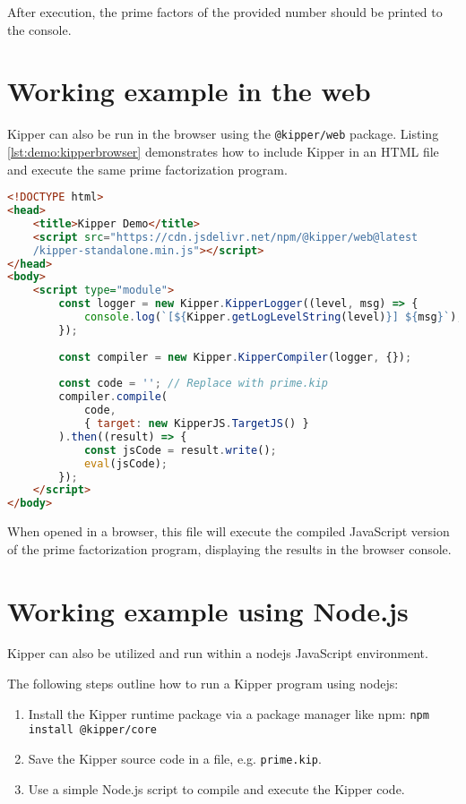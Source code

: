 After execution, the prime factors of the provided number should be printed to the console.

\section{Working example in the web}

Kipper can also be run in the browser using the \texttt{@kipper/web} package. Listing \ref{lst:demo:kipperbrowser} demonstrates how to include Kipper in an HTML file and execute the same prime factorization program.

\begin{lstlisting}[language=HTML,caption=Running Kipper in the browser, label=lst:demo:kipperbrowser]
<!DOCTYPE html>
<head>
	<title>Kipper Demo</title>
	<script src="https://cdn.jsdelivr.net/npm/@kipper/web@latest
	/kipper-standalone.min.js"></script>
</head>
<body>
	<script type="module">
		const logger = new Kipper.KipperLogger((level, msg) => {
			console.log(`[${Kipper.getLogLevelString(level)}] ${msg}`);
		});
		
		const compiler = new Kipper.KipperCompiler(logger, {});
		
		const code = ''; // Replace with prime.kip
		compiler.compile(
			code, 
			{ target: new KipperJS.TargetJS() }
		).then((result) => {
			const jsCode = result.write();
			eval(jsCode);
		});
	</script>
</body>
\end{lstlisting}

When opened in a browser, this file will execute the compiled JavaScript version of the prime factorization program, displaying the results in the browser console.

\section{Working example using Node.js}

Kipper can also be utilized and run within a \Gls{nodejs} JavaScript environment.

 The following steps outline how to run a Kipper program using \Gls{nodejs}:

\begin{enumerate}
	\item Install the Kipper runtime package via a package manager like npm: \lstinline|npm install @kipper/core|
	\item Save the Kipper source code in a file, e.g. \texttt{prime.kip}.
	\item Use a simple Node.js script to compile and execute the Kipper code.
\end{enumerate}


